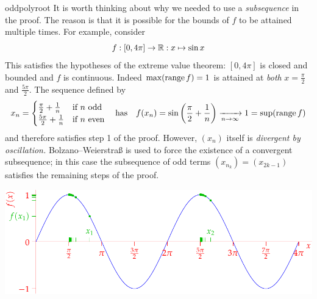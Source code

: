 
\begin{example}{}{oddpolyroot}
	It is worth thinking about why we needed to use a \emph{subsequence} in the proof. The reason is that it is possible for the bounds of $f$ to be attained multiple times. For example, consider
	\[
		f:[0,4\pi]\to\mathbb{R}:x\mapsto \sin x
	\]
	This satisfies the hypotheses of the extreme value theorem: $[0,4\pi]$ is closed and bounded and $f$ is continuous. Indeed $\max(\operatorname{range} f)=1$ is attained at \emph{both} $x=\frac\pi 2$ and $\frac{5\pi}2$. The sequence defined by
	\[
		x_n=
		\begin{cases}
			\frac\pi 2+\frac 1n&\text{if $n$ odd}\\
			\frac{5\pi}2+\frac 1n&\text{if $n$ even}
		\end{cases}\quad\text{has}\quad f(x_n)=\sin\left(\frac\pi 2+\frac 1n\right)\xrightarrow[n\to\infty]{} 1 =\sup(\operatorname{range} f)
	\]
	and therefore satisfies step 1 of the proof. However, $(x_n)$ itself is \emph{divergent by oscillation.} Bolzano--Weierstraß is used to force the existence of a convergent subsequence; in this case the subsequence of odd terms $(x_{n_k})=(x_{2k-1})$ satisfies the remaining steps of the proof.
	\begin{center}
		\includegraphics[scale=0.95]{extval}
	\end{center}
\end{example}

\goodbreak



